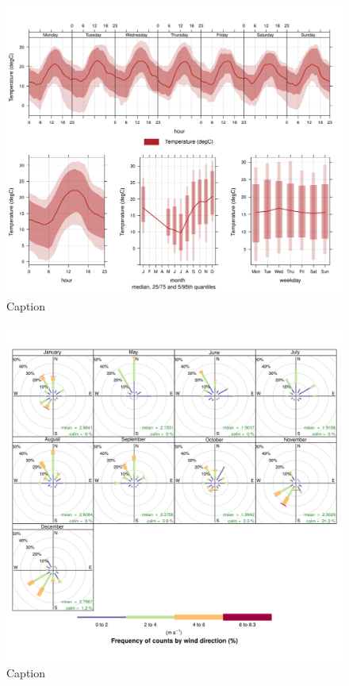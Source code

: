 \documentclass{nwureport}
\begin{document}
\begin{figure}[!htb]
    \centering
    \includegraphics[width=\textwidth]{images/Wedela_Temperature_timevary.png}
    \caption{Caption}
    \label{fig:summary}
\end{figure}

\begin{figure}[!htb]
    \centering
    \includegraphics[width=\textwidth]{images/Wedela-windrose-monthly.png}
    \caption{Caption}
    \label{fig:summary}
\end{figure}
\end{document}
